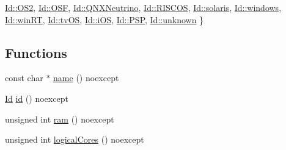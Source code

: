 \begin{DoxyCompactItemize}
\newline
\mbox{\hyperlink{namespacerolmodl_1_1sys_ae00db9e1ee9231659b4d1bce9b1de5aea7ae7a9e16a999bf8956f5d09dd6c67f8}{Id\+::\+O\+S2}}, 
\mbox{\hyperlink{namespacerolmodl_1_1sys_ae00db9e1ee9231659b4d1bce9b1de5aea6f0c7a01492e8abb69844cc2e23d110d}{Id\+::\+O\+SF}}, 
\mbox{\hyperlink{namespacerolmodl_1_1sys_ae00db9e1ee9231659b4d1bce9b1de5aea3a5d58bef2a729a90070c849b8a0010d}{Id\+::\+Q\+N\+X\+Neutrino}}, 
\mbox{\hyperlink{namespacerolmodl_1_1sys_ae00db9e1ee9231659b4d1bce9b1de5aeaff15cfd9a5168d9aa07b7d80d40014c5}{Id\+::\+R\+I\+S\+C\+OS}}, 
\newline
\mbox{\hyperlink{namespacerolmodl_1_1sys_ae00db9e1ee9231659b4d1bce9b1de5aea7bee0477f82303aa43de5d78f7b9cb05}{Id\+::solaris}}, 
\mbox{\hyperlink{namespacerolmodl_1_1sys_ae00db9e1ee9231659b4d1bce9b1de5aea0f4137ed1502b5045d6083aa258b5c42}{Id\+::windows}}, 
\mbox{\hyperlink{namespacerolmodl_1_1sys_ae00db9e1ee9231659b4d1bce9b1de5aea4452b2d89e56662b194bab70acbd258f}{Id\+::win\+RT}}, 
\mbox{\hyperlink{namespacerolmodl_1_1sys_ae00db9e1ee9231659b4d1bce9b1de5aea6dc9155e5a34c48d7c1ef154c368c18d}{Id\+::tv\+OS}}, 
\newline
\mbox{\hyperlink{namespacerolmodl_1_1sys_ae00db9e1ee9231659b4d1bce9b1de5aea1bdf605991920db11cbdf8508204c4eb}{Id\+::i\+OS}}, 
\mbox{\hyperlink{namespacerolmodl_1_1sys_ae00db9e1ee9231659b4d1bce9b1de5aea0e9c9bb3639ba35c67b2492f04a34d99}{Id\+::\+P\+SP}}, 
\mbox{\hyperlink{namespacerolmodl_1_1sys_ae00db9e1ee9231659b4d1bce9b1de5aeaad921d60486366258809553a3db49a4a}{Id\+::unknown}}
 \}
\end{DoxyCompactItemize}
\subsection*{Functions}
\begin{DoxyCompactItemize}
\item 
const char $\ast$ \mbox{\hyperlink{namespacerolmodl_1_1sys_a45b4fd534a68706be049e76057b5d944}{name}} () noexcept
\item 
\mbox{\hyperlink{namespacerolmodl_1_1sys_ae00db9e1ee9231659b4d1bce9b1de5ae}{Id}} \mbox{\hyperlink{namespacerolmodl_1_1sys_ace55dea56d71ff5082e051ccbd370971}{id}} () noexcept
\item 
unsigned int \mbox{\hyperlink{namespacerolmodl_1_1sys_a70ff276777bab09843e24810c773e7cf}{ram}} () noexcept
\item 
unsigned int \mbox{\hyperlink{namespacerolmodl_1_1sys_ad5852b03388e82203ee1637aec25d6ad}{logical\+Cores}} () noexcept
\end{DoxyCompactItemize}


